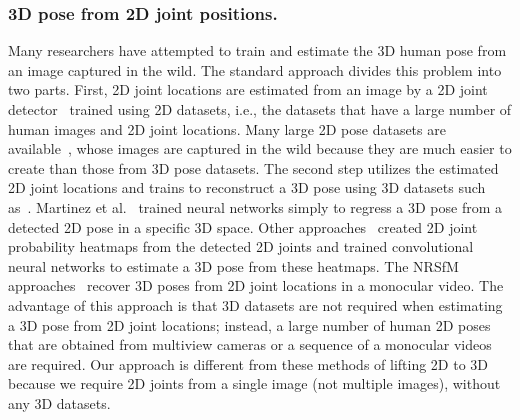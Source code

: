 \documentclass[runningheads]{llncs}
\begin{document}
\subsubsection{3D pose from 2D joint positions.}
Many researchers have attempted to train and estimate the 3D human pose from an image captured in the wild. The standard approach divides this problem into two parts. 
First, 2D joint locations are estimated from an image by a 2D joint detector~\cite{toshev2014deeppose,tompson2014joint,chen2014articulated,tompson2015efficient,fan2015combining,wei2016cpm,carreira2016iterative,bulat2016heatmap,pishchulin2016deepcut,newell2016stacked,cao2017realtime} trained using 2D datasets, i.e., the datasets that have a large number of human images and 2D joint locations.
Many large 2D pose datasets are available~\cite{mpii,mscoco,flic}, whose images are captured in the wild because they are much easier to create than those from 3D pose datasets.
The second step utilizes the estimated 2D joint locations and trains to reconstruct a 3D pose using 3D datasets such as~\cite{sigal2010humaneva,ionescu2014human3.6m}.
Martinez et al.~\cite{martinez20173dbaseline} trained neural networks simply to regress a 3D pose from a detected 2D pose in a specific 3D space.
Other approaches~\cite{tome2017lifting,wu2016single,pavlakos2017coarse} created 2D joint probability heatmaps from the detected 2D joints and trained convolutional neural networks to estimate a 3D pose from these heatmaps.
The NRSfM approaches~\cite{bregler2000recovering,akhter2011trajectory,gotardo2011computing,lee2016procrustean} recover 3D poses from 2D joint locations in a monocular video.
The advantage of this approach is that 3D datasets are not required when estimating a 3D pose from 2D joint locations; instead, a large number of human 2D poses that are obtained from multiview cameras or a sequence of a monocular videos are required.
Our approach is different from these methods of lifting 2D to 3D because we require 2D joints from a single image (not multiple images), without any 3D datasets.
\end{document}
